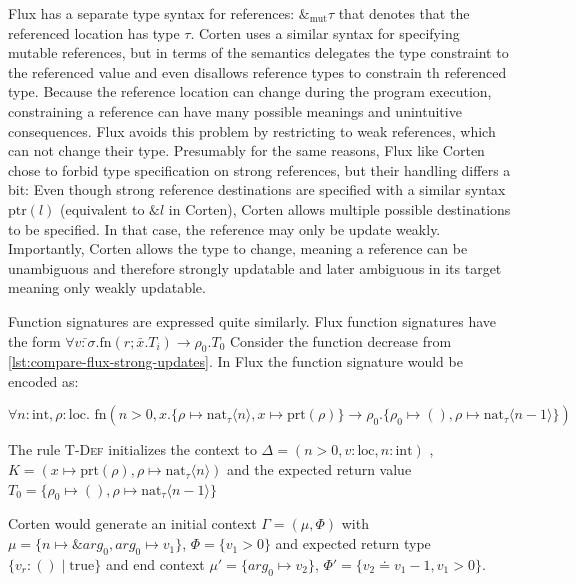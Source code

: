 \documentclass[twoside, english]{sdqthesis}
\theoremstyle{definition}
\begin{document}
Flux has a separate type syntax for references: $\&_{\text{mut}} \tau$ that denotes that the referenced location has type $\tau$. Corten uses a similar syntax for specifying mutable references, but in terms of the semantics delegates the type constraint to the referenced value and even disallows reference types to constrain th referenced type. Because the reference location can change during the program execution, constraining a reference can have many possible meanings and unintuitive consequences. Flux avoids this problem by restricting to weak references, which can not change their type.
Presumably for the same reasons, Flux \- like Corten \- chose to forbid type specification on strong references, but their handling differs a bit: Even though strong reference destinations are specified with a similar syntax $\text{ptr}\left(l\right)$ (equivalent to $\&l$ in Corten), Corten allows multiple possible destinations to be specified. In that case, the reference may only be update weakly. 
Importantly, Corten allows the type to change, meaning a reference can be unambiguous and therefore strongly updatable and later ambiguous in its target meaning only weakly updatable.

Function signatures are expressed quite similarly. 
Flux function signatures have the form $\forall \bar{v : \sigma}. \text{fn}\left(r ; \bar{x}. T_i\right) \to \rho_0.T_0$
Consider the function decrease from \cref{lst:compare-flux-strong-updates}. In Flux the function signature would be encoded as:

\[\forall n : \text{int}, \rho : \text{loc}.
  \text{ fn}\left(n > 0, 
    x.\{ \rho \mapsto \text{nat}_{\tau}\langle n \rangle, x \mapsto \text{prt}(\rho)\}
    \rightarrow 
    \rho_0. \{\rho_0 \mapsto (), \rho \mapsto \text{nat}_{\tau}\langle n - 1 \rangle \}
    \right)
\]

The rule \textsc{T-Def} initializes the context to 
  $\Delta = (n > 0, v : \text{loc}, n : \text{int})$
  , $K = (x \mapsto \text{prt}(\rho), \rho \mapsto \text{nat}_{\tau}\langle n \rangle)$
  and the expected return value $T_0 = \{\rho_0 \mapsto (), \rho \mapsto \text{nat}_{\tau}\langle n - 1 \rangle \}$

Corten would generate an initial context $\Gamma = (\mu, \Phi)$ with $\mu = \{n \mapsto \&arg_0, arg_0 \mapsto v_1\}$, $\Phi = \{v_1 > 0\}$ and expected return type $\{ v_r : () \mid \text{true}\}$ and end context $\mu' = \{arg_0 \mapsto v_2\}$,
$\Phi' = \{v_2 \doteq v_1 - 1, v_1 > 0\}$.
\end{document}
